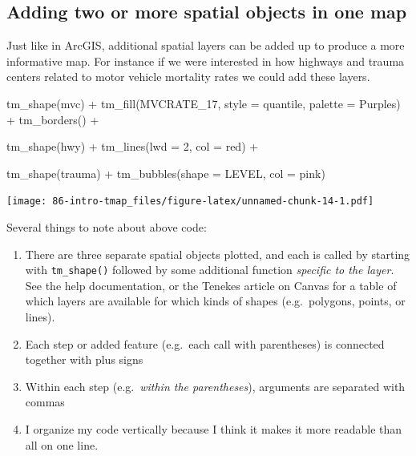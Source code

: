 \documentclass[
]{book}
\newenvironment{Shaded}{\begin{snugshade}}{\end{snugshade}}
\newcommand{\AttributeTok}[1]{\textcolor[rgb]{0.77,0.63,0.00}{#1}}
\newcommand{\DecValTok}[1]{\textcolor[rgb]{0.00,0.00,0.81}{#1}}
\newcommand{\FunctionTok}[1]{\textcolor[rgb]{0.00,0.00,0.00}{#1}}
\newcommand{\NormalTok}[1]{#1}
\newcommand{\SpecialCharTok}[1]{\textcolor[rgb]{0.00,0.00,0.00}{#1}}
\newcommand{\StringTok}[1]{\textcolor[rgb]{0.31,0.60,0.02}{#1}}
\providecommand{\tightlist}{%
  \setlength{\itemsep}{0pt}\setlength{\parskip}{0pt}}
\begin{document}
\hypertarget{adding-two-or-more-spatial-objects-in-one-map}{%
\subsection{Adding two or more spatial objects in one map}\label{adding-two-or-more-spatial-objects-in-one-map}}

Just like in ArcGIS, additional spatial layers can be added up to produce a more informative map. For instance if we were interested in how highways and trauma centers related to motor vehicle mortality rates we could add these layers.

\begin{Shaded}
\begin{Highlighting}[]
\FunctionTok{tm\_shape}\NormalTok{(mvc) }\SpecialCharTok{+} 
  \FunctionTok{tm\_fill}\NormalTok{(}\StringTok{\textquotesingle{}MVCRATE\_17\textquotesingle{}}\NormalTok{,}
          \AttributeTok{style =} \StringTok{\textquotesingle{}quantile\textquotesingle{}}\NormalTok{,}
          \AttributeTok{palette =} \StringTok{\textquotesingle{}Purples\textquotesingle{}}\NormalTok{) }\SpecialCharTok{+}
  \FunctionTok{tm\_borders}\NormalTok{() }\SpecialCharTok{+}

\FunctionTok{tm\_shape}\NormalTok{(hwy) }\SpecialCharTok{+} 
  \FunctionTok{tm\_lines}\NormalTok{(}\AttributeTok{lwd =} \DecValTok{2}\NormalTok{, }\AttributeTok{col =} \StringTok{\textquotesingle{}red\textquotesingle{}}\NormalTok{) }\SpecialCharTok{+}
  
\FunctionTok{tm\_shape}\NormalTok{(trauma) }\SpecialCharTok{+} 
  \FunctionTok{tm\_bubbles}\NormalTok{(}\AttributeTok{shape =} \StringTok{\textquotesingle{}LEVEL\textquotesingle{}}\NormalTok{,}
             \AttributeTok{col =} \StringTok{\textquotesingle{}pink\textquotesingle{}}\NormalTok{)}
\end{Highlighting}
\end{Shaded}

\texttt{[image: 86-intro-tmap\_files/figure-latex/unnamed-chunk-14-1.pdf]}

Several things to note about above code:

\begin{enumerate}
\def\labelenumi{\arabic{enumi}.}
\tightlist
\item
  There are three separate spatial objects plotted, and each is called by starting with \texttt{tm\_shape()} followed by some additional function \emph{specific to the layer}. See the help documentation, or the Tenekes article on Canvas for a table of which layers are available for which kinds of shapes (e.g.~polygons, points, or lines).
\item
  Each step or added feature (e.g.~each call with parentheses) is connected together with plus signs
\item
  Within each step (e.g.~\emph{within the parentheses}), arguments are separated with commas
\item
  I organize my code vertically because I think it makes it more readable than all on one line.
\end{enumerate}
\end{document}
